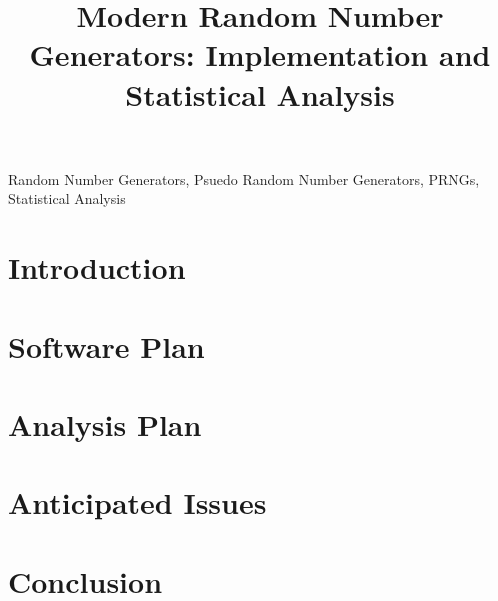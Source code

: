 \documentclass[conference,11pt]{IEEEtran}
\begin{document}
\title{Modern Random Number Generators: Implementation and Statistical Analysis}

\author{
\and
{}
\and
{}
}

\maketitle

\begin{abstract}

\end{abstract}

\begin{IEEEkeywords}
Random Number Generators, Psuedo Random Number Generators, PRNGs, Statistical Analysis
\end{IEEEkeywords}
\section{Introduction}
\label{sec:introduction}


\section{Software Plan}
\label{sec:software_plan}


\section{Analysis Plan}
\label{sec:analysis_plan}


\section{Anticipated Issues}
\label{sec:issues}


\section{Conclusion}
\label{sec:conclusion}




\end{document}
